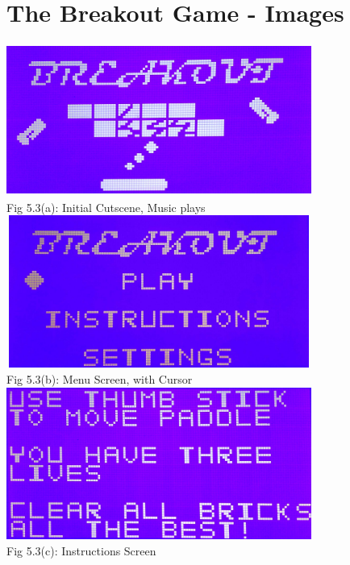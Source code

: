 \documentclass[a4paper,12pt,oneside]{book}
\begin{document}
\section{The Breakout Game - Images}
\begin{center}
\includegraphics[width=10cm, height=5cm]{BreakoutImages/cutscene} \\
{\small Fig 5.3(a): Initial Cutscene, Music plays} \\
\includegraphics[width=10cm, height=5cm]{BreakoutImages/menuScreen} \\
{\small Fig 5.3(b): Menu Screen, with Cursor} \\
\includegraphics[width=10cm, height=5cm]{BreakoutImages/instructionsScreen} \\
{\small Fig 5.3(c): Instructions Screen} \\

\end{center}
\end{document}
